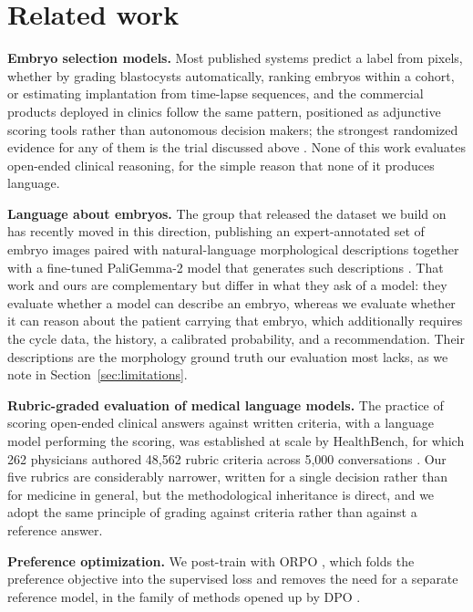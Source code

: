 \documentclass[11pt]{article}
\begin{document}
\section{Related work}

\textbf{Embryo selection models.} Most published systems predict a label from
pixels, whether by grading blastocysts automatically, ranking embryos within a
cohort, or estimating implantation from time-lapse sequences, and the commercial
products deployed in clinics follow the same pattern, positioned as adjunctive
scoring tools rather than autonomous decision makers; the strongest randomized
evidence for any of them is the trial discussed above \citep{illingworth2024}.
None of this work evaluates open-ended clinical reasoning, for the simple reason
that none of it produces language.

\textbf{Language about embryos.} The group that released the dataset we build on
has recently moved in this direction, publishing an expert-annotated set of
embryo images paired with natural-language morphological descriptions
\citep{neu2026dataset} together with a fine-tuned PaliGemma-2 model that generates
such descriptions \citep{neu2026invitrovision}. That work and ours are
complementary but differ in what they ask of a model: they evaluate whether a
model can describe an embryo, whereas we evaluate whether it can reason about the
patient carrying that embryo, which additionally requires the cycle data, the
history, a calibrated probability, and a recommendation. Their descriptions are
the morphology ground truth our evaluation most lacks, as we note in
Section~\ref{sec:limitations}.

\textbf{Rubric-graded evaluation of medical language models.} The practice of
scoring open-ended clinical answers against written criteria, with a language
model performing the scoring, was established at scale by HealthBench, for which
262 physicians authored 48,562 rubric criteria across 5,000 conversations
\citep{arora2025healthbench}. Our five rubrics are considerably narrower, written
for a single decision rather than for medicine in general, but the methodological
inheritance is direct, and we adopt the same principle of grading against
criteria rather than against a reference answer.

\textbf{Preference optimization.} We post-train with ORPO
\citep{hong2024orpo}, which folds the preference objective into the supervised
loss and removes the need for a separate reference model, in the family of
methods opened up by DPO \citep{rafailov2023dpo}.
\end{document}
